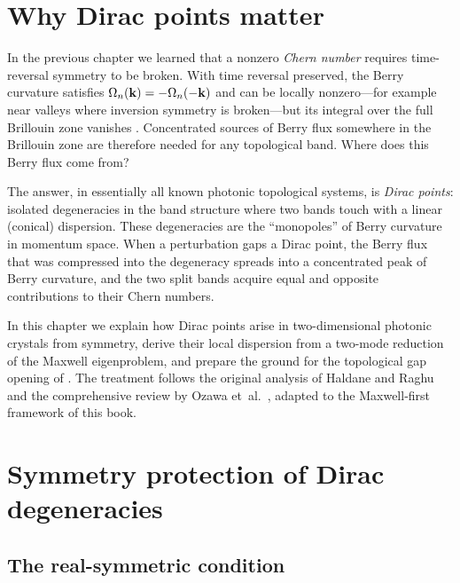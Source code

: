 
\section{Why Dirac points matter}
\label{sec:ch6-why-dirac}

In the previous chapter we learned that a nonzero \emph{Chern number}
requires time-reversal symmetry to be broken.  With time reversal
preserved, the Berry curvature satisfies $\Omega_n(\mathbf{k})=-\Omega_n(-\mathbf{k})$
and can be locally nonzero---for example near valleys where inversion
symmetry is broken---but its integral over the full Brillouin zone
vanishes
\cite{noh2017observation}.  Concentrated sources of Berry flux somewhere in the Brillouin
zone are therefore needed for any topological band.
Where does this Berry flux come from?

The answer, in essentially all known photonic topological systems, is
\emph{Dirac points}: isolated degeneracies in the band structure where
two bands touch with a linear (conical) dispersion.  These degeneracies
are the ``monopoles'' of Berry curvature in momentum space.  When a
perturbation gaps a Dirac point, the Berry flux that was compressed
into the degeneracy spreads into a concentrated peak of Berry curvature,
and the two split bands acquire equal and opposite contributions to
their Chern numbers.

In this chapter we explain how Dirac points arise in two-dimensional
photonic crystals from symmetry, derive their local dispersion from a
two-mode reduction of the Maxwell eigenproblem, and prepare the ground
for the topological gap opening of .  The treatment
follows the original analysis of Haldane and Raghu \cite{haldane2008possible,khanikaev2013photonic}
and the comprehensive review by Ozawa et~al.\ \cite{ozawa2018topological},
adapted to the Maxwell-first framework of this book.

\section{Symmetry protection of Dirac degeneracies}
\label{sec:ch6-symmetry}

\subsection{The real-symmetric condition}
\label{sec:ch6-real-symmetric}

